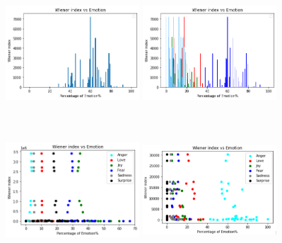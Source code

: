 \documentclass[acmtog]{acmart}
\begin{document}
\begin{figure}[h]
  \begin{minipage}{.33\textwidth}
    \centering
    \includegraphics[width=5cm,height=5cm,keepaspectratio]{wie_anger.png}
  \end{minipage}%
  \begin{minipage}{.33\textwidth}
    \centering
    \includegraphics[width=5cm,height=5cm,keepaspectratio]{anger_bar_wie.png}
  \end{minipage}%
  \begin{minipage}{.33\textwidth}
    \centering
    \includegraphics[width=5cm,height=5cm,keepaspectratio]{joy_wiecovid1.png}
  \end{minipage}
 \medskip
  \begin{minipage}{.33\textwidth}
    \centering
    \includegraphics[width=5cm,height=5cm,keepaspectratio]{WAnger_ws.pdf}

\end{minipage}
\end{figure}
\end{document}
